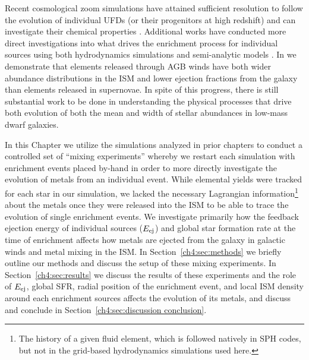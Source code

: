 
Recent cosmological zoom simulations have attained sufficient resolution to follow the evolution of individual UFDs (or their progenitors at high redshift) and can investigate their chemical properties \citep{Jeon2017,Corlies2018,Escala2018,Christensen2018}. Additional works have conducted more direct investigations into what drives the enrichment process for individual sources using both hydrodynamics simulations \citep{PanScannapiecoScalo2013,Ritter2015,Safarzadeh2017,Hirai2015,Hirai2017,Emerick2018b,HaynesKobayashi2019} and semi-analytic models \citep{Beniamini2018,KrumholzTing2018}. In \cite{Emerick2018b} we demonstrate that elements released through AGB winds have both wider abundance distributions in the ISM and lower ejection fractions from the galaxy than elements released in supernovae.
In spite of this progress, there is still substantial work to be done in understanding the physical processes that drive both evolution of both the mean and width of stellar abundances in low-mass dwarf galaxies.

In this Chapter we utilize the simulations analyzed in prior chapters to conduct a controlled set of ``mixing experiments'' whereby we restart each simulation with enrichment events placed by-hand in order to more directly investigate the evolution of metals from an individual event. While elemental yields were tracked for each star in our simulation, we lacked the necessary Lagrangian information\footnote{The history of a given fluid element, which is followed natively in SPH codes, but not in the grid-based hydrodynamics simulations used here.} about the metals once they were released into the ISM to be able to trace the evolution of single enrichment events. We investigate primarily how the feedback ejection energy of individual sources ($E_{\rm ej}$) and global star formation rate at the time of enrichment affects how metals are ejected from the galaxy in galactic winds and metal mixing in the ISM. In Section~\ref{ch4:sec:methods} we briefly outline our methods and discuss the setup of these mixing experiments. In Section~\ref{ch4:sec:results} we discuss the results of these experiments and the role of $E_{\rm ej}$, global SFR, radial position of the enrichment event, and local ISM density around each enrichment sources affects the evolution of its metals, and discuss and conclude in Section~\ref{ch4:sec:discussion conclusion}.


